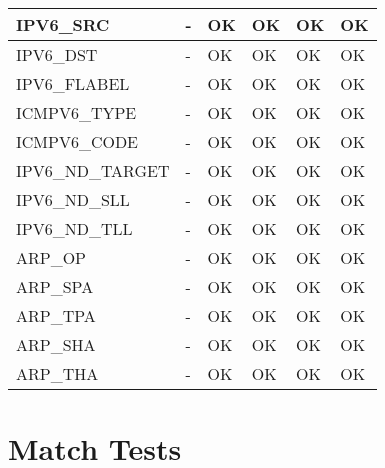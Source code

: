 \begin{table}[H]
\begin{tabular}{|l|l|l|l|l|l|}
IPV6\_SRC           & -        & OK    & OK    & OK    & OK    \\ \hline
IPV6\_DST           & -        & OK    & OK    & OK    & OK    \\ \hline
IPV6\_FLABEL        & -        & OK    & OK    & OK    & OK    \\ \hline
ICMPV6\_TYPE        & -        & OK    & OK    & OK    & OK    \\ \hline
ICMPV6\_CODE        & -        & OK    & OK    & OK    & OK    \\ \hline
IPV6\_ND\_TARGET    & -        & OK    & OK    & OK    & OK    \\ \hline
IPV6\_ND\_SLL       & -        & OK    & OK    & OK    & OK    \\ \hline
IPV6\_ND\_TLL       & -        & OK    & OK    & OK    & OK    \\ \hline
ARP\_OP             & -        & OK    & OK    & OK    & OK    \\ \hline
ARP\_SPA            & -        & OK    & OK    & OK    & OK    \\ \hline
ARP\_TPA            & -        & OK    & OK    & OK    & OK    \\ \hline
ARP\_SHA            & -        & OK    & OK    & OK    & OK    \\ \hline
ARP\_THA            & -        & OK    & OK    & OK    & OK    \\ \hline
\end{tabular}
\end{table}

\section{Match Tests}


